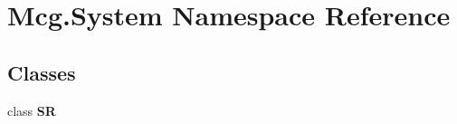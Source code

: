 \hypertarget{namespace_mcg_1_1_system}{}\section{Mcg.\+System Namespace Reference}
\label{namespace_mcg_1_1_system}
\subsection*{Classes}
\begin{DoxyCompactItemize}
\item 
class {\bfseries SR}
\end{DoxyCompactItemize}
